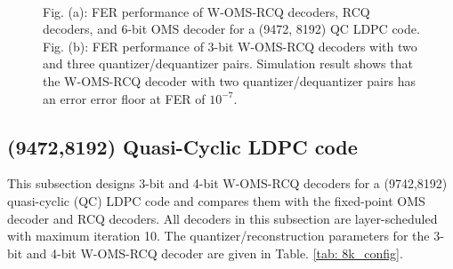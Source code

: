 \documentclass [PhD] {uclathes}
\begin{document}
\begin{figure}[hp] 
    \centering
  \\
  \caption{Fig. (a): FER performance of W-OMS-RCQ decoders, RCQ decoders, and 6-bit OMS decoder for a (9472, 8192) QC LDPC code. Fig. (b): FER performance of 3-bit W-OMS-RCQ decoders with two and three quantizer/dequantizer pairs. Simulation result shows that the W-OMS-RCQ decoder with two quantizer/dequantizer pairs has an error error floor at FER of $10^{-7}$. }
\end{figure}



\subsection{(9472,8192) Quasi-Cyclic LDPC code}
This subsection designs 3-bit and 4-bit W-OMS-RCQ decoders  for a (9742,8192) quasi-cyclic (QC) LDPC code  and compares them with the fixed-point OMS decoder and RCQ decoders. All decoders in this subsection are layer-scheduled with maximum iteration 10. The quantizer/reconstruction parameters for the 3-bit and 4-bit W-OMS-RCQ decoder are given in Table. \ref{tab: 8k_config}.
\end{document}
